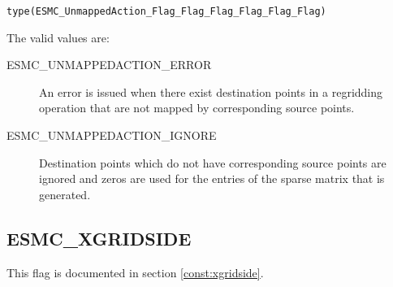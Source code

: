 {\tt type(ESMC\_UnmappedAction\_Flag\_Flag\_Flag\_Flag\_Flag\_Flag)}

The valid values are:
\begin{description}
	\item[ESMC\_UNMAPPEDACTION\_ERROR]
	An error is issued when there exist destination points in a regridding
	operation that are not mapped by corresponding source points.
	\item[ESMC\_UNMAPPEDACTION\_IGNORE]
	Destination points which do not have corresponding source points are 
	ignored and zeros are used for the entries of the sparse matrix
	that is generated.
\end{description}

\subsection{ESMC\_XGRIDSIDE}
This flag is documented in section \ref{const:xgridside}.
